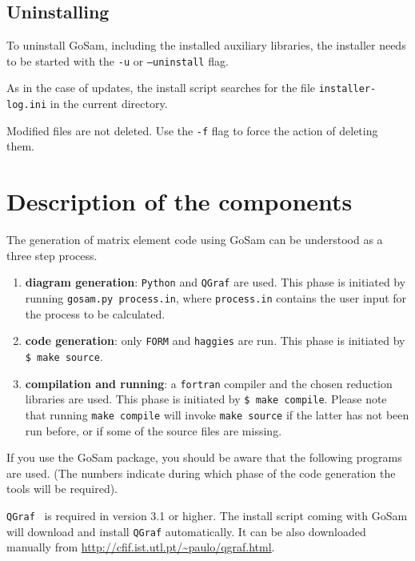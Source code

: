 \documentclass[11pt,a4paper]{refrep}
\newcommand{\gosamversion}{{2{.}0}}
\newcommand{\gosam}{{\sc GoSam}\xspace}
\newcommand{\gosamv}[1][\gosamversion]{{\sc GoSam}\xspace}
\newcommand{\qgraf}{{\tt QGraf}\xspace}
\newcommand{\form}{{\tt FORM}\xspace}
\newcommand{\python}{{\tt Python}\xspace}
\newcommand{\haggies}{{\tt haggies}\xspace}
\begin{document}
\subsection{Uninstalling}
To uninstall \gosam, including the installed auxiliary libraries,
the installer needs to be started with the {\tt -u} or {\tt --uninstall} flag.

As in the case of updates, the install script searches for the file 
{\tt installer-log.ini} in the current directory.

Modified files are not deleted. Use the {\tt -f} flag to force the action of
deleting them.




\section{Description of the components}


The generation of matrix element code using \gosamv can be understood
as a three step process. 
\begin{enumerate}
\item  {\bf diagram generation}: \python
and \qgraf are used. This phase is initiated by
running \texttt{gosam.py process.in}, where {\tt process.in} contains the 
user input for the process to be calculated.
\item {\bf code generation}: only \form and \haggies are run.
This phase is initiated by  \texttt{\$ make source}.
\item {\bf compilation and running}: 
a {\tt fortran} compiler and the chosen reduction libraries are used.
This phase is initiated
by  \texttt{\$ make compile}. Please note that running
\texttt{make compile} will invoke \texttt{make source} if the latter
has not been run  before, or if some of the source files are missing.
\end{enumerate}

If you use the \gosamv package, you should be aware that
the following programs are used.
(The numbers indicate during which phase of the code generation
the tools will be required).

\marginlabel{\qgraf (1)} \qgraf~\cite{Nogueira:1991ex}
is required in version 3{.}1 or
higher. 
The install script coming with \gosamv[2] will download and install \qgraf
automatically.
It can be also downloaded manually from
\url{http://cfif.ist.utl.pt/~paulo/qgraf.html}.
\end{document}
